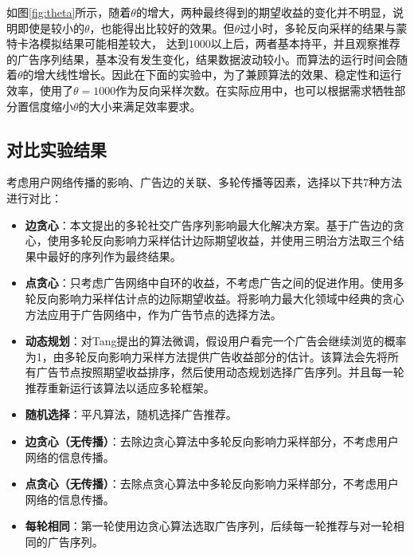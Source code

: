 如图\ref{fig:theta}所示，随着$\theta$的增大，两种最终得到的期望收益的变化并不明显，说明即使是较小的$\theta$，也能得出比较好的效果。但$\theta$过小时，多轮反向采样的结果与蒙特卡洛模拟结果可能相差较大， 达到$1000$以上后，两者基本持平，并且观察推荐的广告序列结果，基本没有发生变化，结果数据波动较小。而算法的运行时间会随着$\theta$的增大线性增长。因此在下面的实验中，为了兼顾算法的效果、稳定性和运行效率，使用了$\theta=1000$作为反向采样次数。在实际应用中，也可以根据需求牺牲部分置信度缩小$\theta$的大小来满足效率要求。

\subsection{对比实验结果}

考虑用户网络传播的影响、广告边的关联、多轮传播等因素，选择以下共7种方法进行对比：

\begin{itemize}
    \item {\bfseries 边贪心}：本文提出的多轮社交广告序列影响最大化解决方案。基于广告边的贪心，使用多轮反向影响力采样估计边际期望收益，并使用三明治方法取三个结果中最好的序列作为最终结果。
    \item {\bfseries 点贪心}：只考虑广告网络中自环的收益，不考虑广告之间的促进作用。使用多轮反向影响力采样估计点的边际期望收益。将影响力最大化领域中经典的贪心方法\cite{kempe2003maximizing}应用于广告网络中，作为广告节点的选择方法。
    \item {\bfseries 动态规划}：对Tang\cite{tang2018social}提出的算法微调，假设用户看完一个广告会继续浏览的概率为1，由多轮反向影响力采样方法提供广告收益部分的估计。该算法会先将所有广告节点按照期望收益排序，然后使用动态规划选择广告序列。并且每一轮推荐重新运行该算法以适应多轮框架。
    \item {\bfseries 随机选择}：平凡算法，随机选择广告推荐。
    \item {\bfseries 边贪心（无传播）}：去除边贪心算法中多轮反向影响力采样部分，不考虑用户网络的信息传播。
    \item {\bfseries 点贪心（无传播）}：去除点贪心算法中多轮反向影响力采样部分，不考虑用户网络的信息传播。
    \item {\bfseries 每轮相同}：第一轮使用边贪心算法选取广告序列，后续每一轮推荐与对一轮相同的广告序列。 
\end{itemize}

